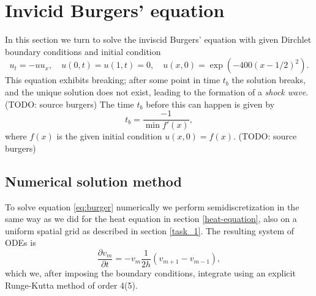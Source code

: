 
%
%    

\newpage
\section{Invicid Burgers' equation}

In this section we turn to solve the inviscid Burgers' equation with given Dirchlet boundary conditions and initial condition
\begin{equation}
    u_t = -uu_x, \quad u(0, t) = u(1, t) = 0, \quad u(x, 0) = \exp(-400(x-1/2)^2).
    \label{eq:burger}
\end{equation}
This equation exhibits breaking; 
after some point in time $t_b$ the solution breaks, 
and the unique solution does not exist, 
leading to the formation of a \textit{shock wave}. (TODO: source burgers)
The time $t_b$ before this can happen is given by
\begin{equation}
    t_b = \frac{-1}{\min f'(x)}, 
    \label{eq:t_break}
\end{equation}
where $f(x)$ is the given initial condition $u(x, 0) = f(x)$. (TODO: source burgers)

\subsection*{Numerical solution method}
To solve equation \eqref{eq:burger} numerically we perform semidiscretization in the same way as we did for the heat equation in section \ref{heat-equation}, 
also on a uniform spatial grid as described in section \ref{task_1}. 
The resulting system of ODEs is
\begin{equation*}
    \frac{\partial v_m}{\partial t} = -v_m \frac{1}{2h} (v_{m+1} - v_{m-1}), 
\end{equation*}
which we, after imposing the boundary conditions, 
integrate using an explicit Runge-Kutta method of order 4(5). 

